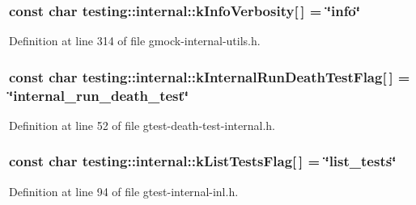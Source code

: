 \subsubsection[{\texorpdfstring{k\+Info\+Verbosity}{kInfoVerbosity}}]{\setlength{\rightskip}{0pt plus 5cm}const char testing\+::internal\+::k\+Info\+Verbosity\mbox{[}$\,$\mbox{]} = \char`\"{}info\char`\"{}}\hypertarget{namespacetesting_1_1internal_a96274a788ffc75a6dffdfa8aa1f34fb9}{}\label{namespacetesting_1_1internal_a96274a788ffc75a6dffdfa8aa1f34fb9}


Definition at line 314 of file gmock-\/internal-\/utils.\+h.

\subsubsection[{\texorpdfstring{k\+Internal\+Run\+Death\+Test\+Flag}{kInternalRunDeathTestFlag}}]{\setlength{\rightskip}{0pt plus 5cm}const char testing\+::internal\+::k\+Internal\+Run\+Death\+Test\+Flag\mbox{[}$\,$\mbox{]} = \char`\"{}internal\+\_\+run\+\_\+death\+\_\+test\char`\"{}}\hypertarget{namespacetesting_1_1internal_a8572303d929880adf30db00952e1c45d}{}\label{namespacetesting_1_1internal_a8572303d929880adf30db00952e1c45d}


Definition at line 52 of file gtest-\/death-\/test-\/internal.\+h.

\subsubsection[{\texorpdfstring{k\+List\+Tests\+Flag}{kListTestsFlag}}]{\setlength{\rightskip}{0pt plus 5cm}const char testing\+::internal\+::k\+List\+Tests\+Flag\mbox{[}$\,$\mbox{]} = \char`\"{}list\+\_\+tests\char`\"{}}\hypertarget{namespacetesting_1_1internal_a1d3cfebffefbf35f7033d4941493a8ff}{}\label{namespacetesting_1_1internal_a1d3cfebffefbf35f7033d4941493a8ff}


Definition at line 94 of file gtest-\/internal-\/inl.\+h.

